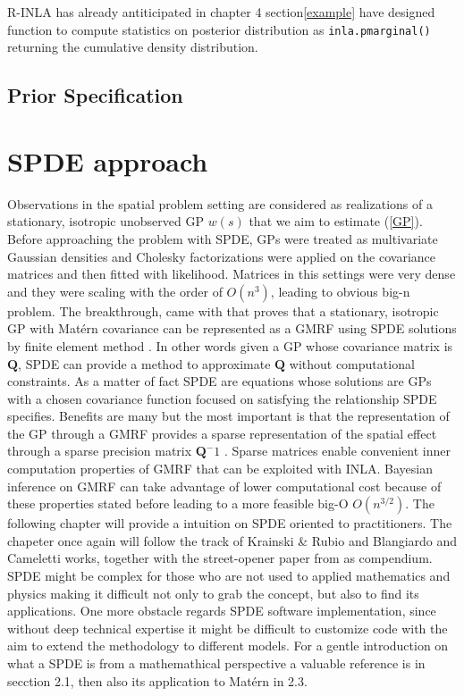 \documentclass[
  12pt,
  a4paper,
  oneside]{book}
\theoremstyle{definition}
\theoremstyle{definition}
\theoremstyle{definition}
\theoremstyle{remark}
\begin{document}
R-INLA has already antiticipated in chapter 4 section\ref{example} have designed function to compute statistics on posterior distribution as \texttt{inla.pmarginal()} returning the cumulative density distribution.

\hypertarget{prior-specification}{%
\section{Prior Specification}\label{prior-specification}}

\hypertarget{spde}{%
\chapter{SPDE approach}\label{spde}}

Observations in the spatial problem setting are considered as realizations of a stationary, isotropic unobserved GP \(w(s)\) that we aim to estimate (\ref{GP}). Before approaching the problem with SPDE, GPs were treated as multivariate Gaussian densities and Cholesky factorizations were applied on the covariance matrices and then fitted with likelihood. Matrices in this settings were very dense and they were scaling with the order of \(O\left(n^{3}\right)\), leading to obvious big-n problem.
The breakthrough, came with \citet{Lindgren2011} that proves that a stationary, isotropic GP with Matérn covariance can be represented as a GMRF using SPDE solutions by finite element method \citep{Krainski-Rubio}. In other words given a GP whose covariance matrix is \(\boldsymbol{Q}\), SPDE can provide a method to approximate \(\boldsymbol{Q}\) without computational constraints. As a matter of fact SPDE are equations whose solutions are GPs with a chosen covariance function focused on satisfying the relationship SPDE specifies.
Benefits are many but the most important is that the representation of the GP through a GMRF provides a sparse representation of the spatial effect through a sparse precision matrix \(\boldsymbol{Q}^-1\) . Sparse matrices enable convenient inner computation properties of GMRF that can be exploited with INLA. Bayesian inference on GMRF can take advantage of lower computational cost because of these properties stated before leading to a more feasible big-O \(O\left(n^{3 / 2}\right)\). The following chapter will provide a intuition on SPDE oriented to practitioners. The chapeter once again will follow the track of Krainski \& Rubio \citeyearpar{Krainski-Rubio} and Blangiardo and Cameletti \citeyearpar{Blangiardo-Cameletti} works, together with the street-opener paper from \citet{Miller2019} as compendium. SPDE might be complex for those who are not used to applied mathematics and physics making it difficult not only to grab the concept, but also to find its applications. One more obstacle regards SPDE software implementation, since without deep technical expertise it might be difficult to customize code with the aim to extend the methodology to different models. For a gentle introduction on what a SPDE is from a mathemathical perspective a valuable reference is \citet{Miller2019} in secction 2.1, then also its application to Matérn in 2.3.
\end{document}
